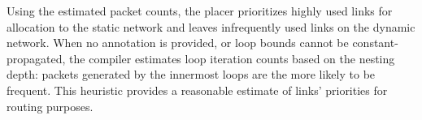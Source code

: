 Using the estimated packet counts, the placer prioritizes highly used links for allocation to the static network and leaves infrequently used links on the dynamic network. 
When no annotation is provided, or loop bounds cannot be constant-propagated, the compiler estimates
loop iteration counts based on the nesting depth: packets generated by the innermost loops are 
the more likely to be frequent.
This heuristic provides a reasonable estimate of links' priorities for routing purposes.

